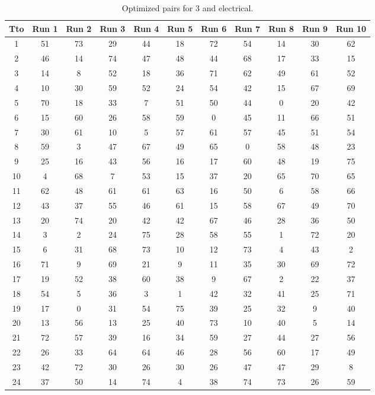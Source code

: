\begin{table}
  \centering
  \scriptsize
  \caption{Optimized pairs for 3 and electrical.}
  \label{tab_pairs}
\begin{tabular}{c c c c c c c c c c c }
\hline
Tto & Run 1 & Run 2 & Run 3 & Run 4 & Run 5 & Run 6 & Run 7 & Run 8 & Run 9 & Run 10 \\
\hline
1 & 51 & 73 & 29 & 44 & 18 & 72 & 54 & 14 & 30 & 62 \\
2 & 46 & 14 & 74 & 47 & 48 & 44 & 68 & 17 & 33 & 15 \\
3 & 14 & 8 & 52 & 18 & 36 & 71 & 62 & 49 & 61 & 52 \\
4 & 10 & 30 & 59 & 52 & 24 & 54 & 42 & 15 & 67 & 69 \\
5 & 70 & 18 & 33 & 7 & 51 & 50 & 44 & 0 & 20 & 42 \\
6 & 15 & 60 & 26 & 58 & 59 & 0 & 45 & 11 & 66 & 51 \\
7 & 30 & 61 & 10 & 5 & 57 & 61 & 57 & 45 & 51 & 54 \\
8 & 59 & 3 & 47 & 67 & 49 & 65 & 0 & 58 & 48 & 23 \\
9 & 25 & 16 & 43 & 56 & 16 & 17 & 60 & 48 & 19 & 75 \\
10 & 4 & 68 & 7 & 53 & 15 & 37 & 20 & 65 & 70 & 65 \\
11 & 62 & 48 & 61 & 61 & 63 & 16 & 50 & 6 & 58 & 66 \\
12 & 43 & 37 & 55 & 46 & 61 & 15 & 58 & 67 & 49 & 70 \\
13 & 20 & 74 & 20 & 42 & 42 & 67 & 46 & 28 & 36 & 50 \\
14 & 3 & 2 & 24 & 75 & 28 & 58 & 55 & 1 & 72 & 20 \\
15 & 6 & 31 & 68 & 73 & 10 & 12 & 73 & 4 & 43 & 2 \\
16 & 71 & 9 & 69 & 21 & 9 & 11 & 35 & 30 & 69 & 72 \\
17 & 19 & 52 & 38 & 60 & 38 & 9 & 67 & 2 & 22 & 37 \\
18 & 54 & 5 & 36 & 3 & 1 & 42 & 32 & 41 & 25 & 71 \\
19 & 17 & 0 & 31 & 54 & 75 & 39 & 25 & 32 & 9 & 40 \\
20 & 13 & 56 & 13 & 25 & 40 & 73 & 10 & 40 & 5 & 14 \\
21 & 72 & 57 & 39 & 16 & 34 & 59 & 27 & 44 & 27 & 56 \\
22 & 26 & 33 & 64 & 64 & 46 & 28 & 56 & 60 & 17 & 49 \\
23 & 42 & 72 & 30 & 26 & 30 & 26 & 47 & 47 & 29 & 8 \\
24 & 37 & 50 & 14 & 74 & 4 & 38 & 74 & 73 & 26 & 59 \\

\end{tabular}
\end{table}
